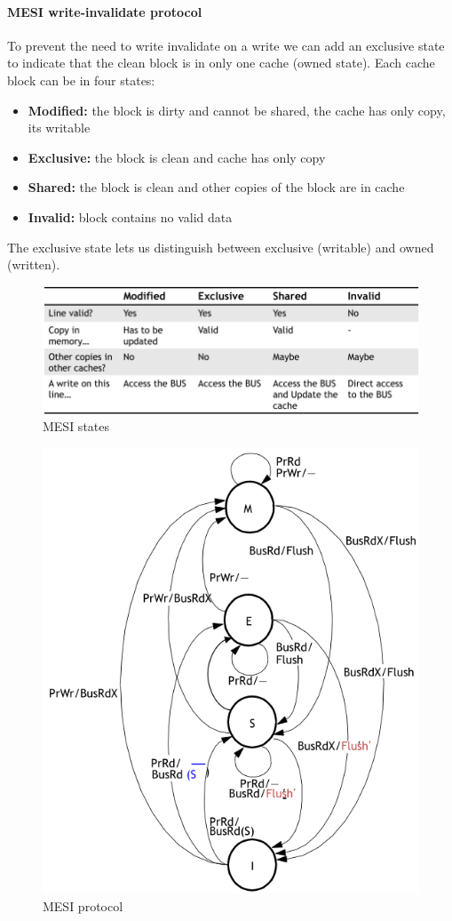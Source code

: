 \paragraph{MESI write-invalidate protocol}
To prevent the need to write invalidate on a write we can add an exclusive state to indicate that the clean block is
in only one cache (owned state).
Each cache block can be in four states:
\begin{itemize}
    \item \textbf{Modified:} the block is dirty and cannot be shared, the cache has only copy, its writable
    \item \textbf{Exclusive:} the block is clean and cache has only copy
    \item \textbf{Shared:} the block is clean and other copies of the block are in cache
    \item \textbf{Invalid:} block contains no valid data
\end{itemize}
The exclusive state lets us distinguish between exclusive (writable) and owned (written).

\begin{figure}[h]
    \centering
    \includegraphics[width=\linewidth]{images/mesi-protocol-states}
    \caption{MESI states}
    \label{fig:mesi-protocol-states}
\end{figure}

\begin{figure}[h]
    \centering
    \includegraphics[width=0.7\linewidth]{images/mesi-protocol}
    \caption{MESI protocol}
    \label{fig:mesi-protocol}
\end{figure}

